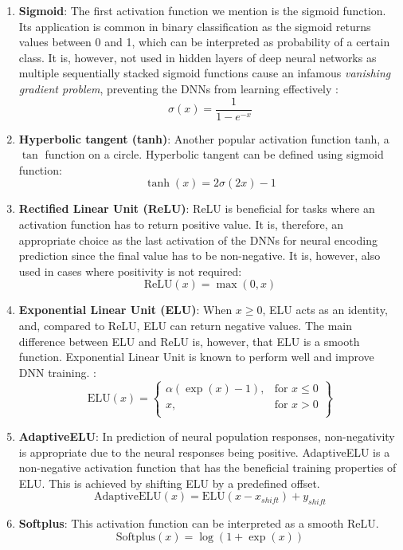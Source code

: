 \begin{enumerate}
	\item \textbf{Sigmoid}: The first activation function we mention is the sigmoid function. Its application is common in binary classification as the sigmoid returns values between 0 and 1, which can be interpreted as probability of a certain class. It is, however, not used in hidden layers of deep neural networks as multiple sequentially stacked sigmoid functions cause an infamous \emph{vanishing gradient problem}, preventing the DNNs from learning effectively \citep{Goodfellow-et-al-2016}:
	\begin{equation}
		\sigma (x) = \frac{1}{1 - e^{-x}}
	\end{equation}
	\item \textbf{Hyperbolic tangent (tanh)}: Another popular activation function tanh, a $\tan$ function on a circle. Hyperbolic tangent can be defined using sigmoid function:
	\begin{equation}
		\tanh (x) = 2 \sigma(2x) - 1
	\end{equation}
	\item \textbf{Rectified Linear Unit (ReLU)}: ReLU is beneficial for tasks where an activation function has to return positive value. It is, therefore, an appropriate choice as the last activation of the DNNs for neural encoding prediction since the final value has to be non-negative. It is, however, also used in cases where positivity is not required:
	\begin{equation}
	\text{ReLU} (x) = \max(0, x)
	\end{equation}
	\item \textbf{Exponential Linear Unit (ELU)}: When $x \geq 0$, ELU acts as an identity, and, compared to ReLU, ELU can return negative values. The main difference between ELU and ReLU is, however, that ELU is a smooth function. Exponential Linear Unit is known to perform well and improve DNN training. \citep{clevert2015fast}:
	\begin{equation}
	\text{ELU} (x) = \left\{\begin{array}{lr}
	\alpha (\exp(x) - 1), & \text{for } x \leq 0 \\
	x, & \text{for } x > 0 \\
	\end{array}\right\}
	\end{equation}
	\item \textbf{AdaptiveELU}: In prediction of neural population responses, non-negativity is appropriate due to the neural responses being positive. AdaptiveELU is a non-negative activation function that has the beneficial training properties of ELU. This is achieved by shifting ELU by a predefined offset.
	\begin{equation}
	\text{AdaptiveELU}(x) = \text{ELU}(x - x_{shift}) + y_{shift}
	\end{equation}
	\item \textbf{Softplus}: This activation function can be interpreted as a smooth ReLU.
	\begin{equation}
	\text{Softplus} (x) = \log(1 + \exp(x))
	\end{equation}
\end{enumerate}


